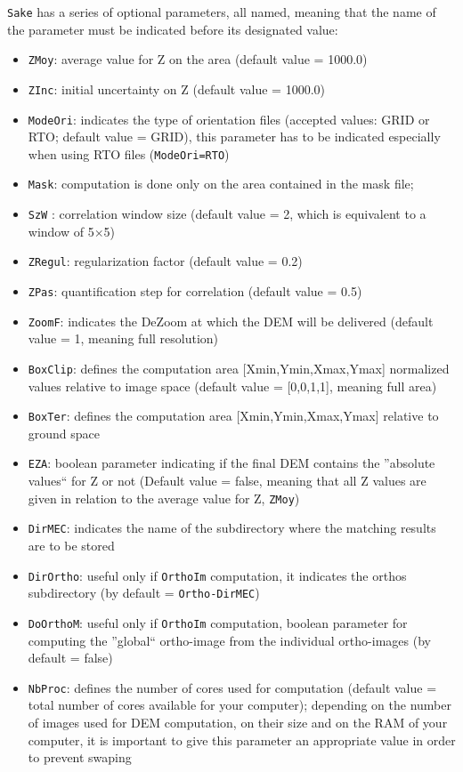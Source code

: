 \vspace{0.3cm}
{\tt Sake} has a series of optional parameters, all named, meaning that the name of the parameter must be indicated before its designated value:
\begin{itemize}
  \item {\tt ZMoy}: average value for Z on the area (default value = 1000.0)
  \item {\tt ZInc}: initial uncertainty on Z (default value = 1000.0)
  \item {\tt ModeOri}: indicates the type of orientation files (accepted values: GRID or RTO; default value = GRID), this parameter has to be indicated especially when using RTO files ({\tt ModeOri=RTO})
  \item {\tt Mask}: computation is done only on the area contained in the mask file;
  \item {\tt SzW} : correlation window size (default value = 2, which is equivalent to a window of 5$\times$5)
  \item {\tt ZRegul}: regularization factor (default value = 0.2)
  \item {\tt ZPas}: quantification step for correlation (default value = 0.5)
  \item {\tt ZoomF}: indicates the DeZoom at which the DEM will be delivered (default value = 1, meaning full resolution)
  \item {\tt BoxClip}: defines the computation area [Xmin,Ymin,Xmax,Ymax] normalized values relative to image space (default value = [0,0,1,1], meaning full area)
  \item {\tt BoxTer}: defines the computation area [Xmin,Ymin,Xmax,Ymax] relative to ground space
  \item {\tt EZA}: boolean parameter indicating if the final DEM contains the ''absolute values`` for Z or not (Default value = false, meaning that all Z values are given in relation to the average value for Z, {\tt ZMoy})
  \item {\tt DirMEC}: indicates the name of the subdirectory where the matching results are to be stored
  \item {\tt DirOrtho}: useful only if {\tt OrthoIm} computation, it indicates the orthos subdirectory (by default = {\tt Ortho-{DirMEC}})
  \item {\tt DoOrthoM}: useful only if {\tt OrthoIm} computation, boolean parameter for computing the ''global`` ortho-image from the individual ortho-images (by default = false)
  \item {\tt NbProc}: defines the number of cores used for computation (default value = total number of cores available for your computer); depending on the number of images used for DEM computation, on their size and on the RAM of your computer, it is important to give this parameter an appropriate value in order to prevent swaping
\end{itemize}

